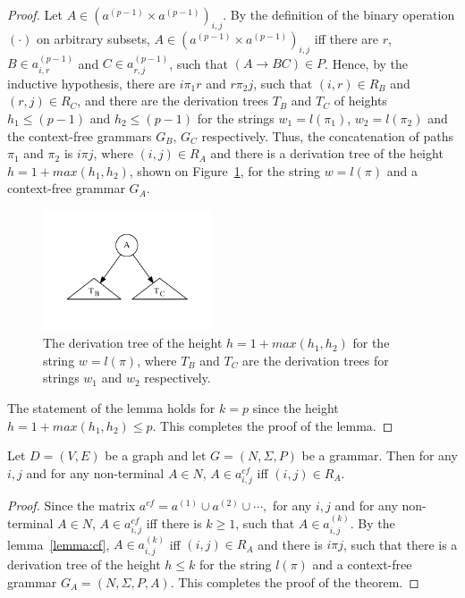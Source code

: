 \begin{proof}
Let $A \in (a^{(p-1)} \times a^{(p-1)})_{i,j}$. By the definition of the binary operation $(\cdot)$ on arbitrary subsets, $A \in (a^{(p-1)} \times a^{(p-1)})_{i,j}$ iff there are $r$, $B \in a^{(p-1)}_{i,r}$ and $C \in a^{(p-1)}_{r,j}$, such that $(A \rightarrow B C) \in P$. Hence, by the inductive hypothesis, there are $i \pi_1 r$ and $r \pi_2 j$, such that $(i,r) \in R_B$ and $(r,j) \in R_C$, and there are the derivation trees $T_B$ and $T_C$ of heights $h_1 \leq (p-1)$ and $h_2 \leq (p-1)$ for the strings $w_1 = l(\pi_1)$, $w_2 = l(\pi_2)$ and the context-free grammars $G_B$, $G_C$ respectively. Thus, the concatenation of paths $\pi_1$ and $\pi_2$ is $i \pi j$, where $(i,j) \in R_A$ and there is a derivation tree of the height $h = 1 + max(h_1, h_2)$, shown on Figure~\ref{tree2}, for the string $w = l(\pi)$ and a context-free grammar $G_A$.

\begin{figure}[h!]
 \centering
 \includegraphics[width=5cm]{pictures/tree2.pdf}
 \caption{The derivation tree of the height $h = 1 + max(h_1, h_2)$ for the string $w = l(\pi)$, where $T_B$ and $T_C$ are the derivation trees for strings $w_1$ and $w_2$ respectively.}
 \label{tree2}
\end{figure}

The statement of the lemma holds for $k = p$ since the height $h = 1 + max(h_1, h_2) \leq p$. This completes the proof of the lemma.
\end{proof}

\begin{mytheorem}\label{thm:correct}
 Let $D = (V,E)$ be a graph and let $G =(N,\Sigma,P)$ be a grammar. Then for any $i, j$ and for any non-terminal $A \in N$, $A \in a^{cf}_{i,j}$ iff $(i,j) \in R_A$.
\end{mytheorem}
\begin{proof}

Since the matrix $a^{cf} = a^{(1)} \cup a^{(2)} \cup \cdots,$ for any $i, j$ and for any non-terminal $A \in N$, $A \in a^{cf}_{i,j}$ iff there is $k \geq 1$, such that $A \in a^{(k)}_{i,j}$. By the lemma~\ref{lemma:cf}, $A \in a^{(k)}_{i,j}$ iff $(i,j) \in R_A$ and there is $i \pi j$, such that there is a derivation tree of the height $h \leq k$ for the string $l(\pi)$ and a context-free grammar $G_A = (N,\Sigma,P,A)$. This completes the proof of the theorem.
\end{proof}

